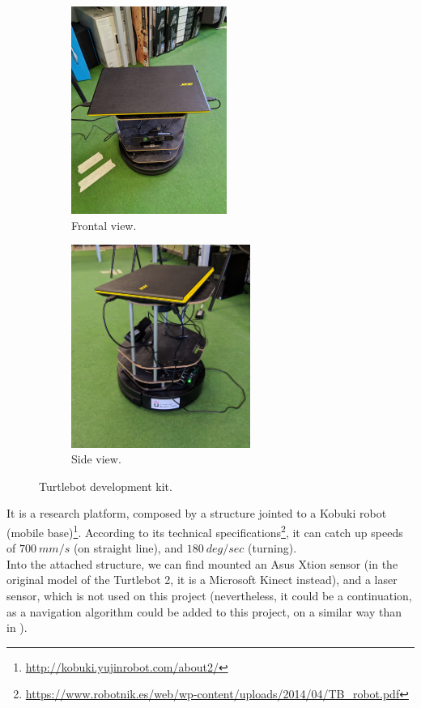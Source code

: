 		\begin{figure}[h]
			\centering
			\begin{subfigure}[h]{0.4\linewidth}
				\includegraphics[width=2in]{images/real_turtlebot_1}
				\caption{Frontal view.}
				\label{fig:3_turtlebot_front}
			\end{subfigure}
			\begin{subfigure}[h]{0.4\linewidth}
				\includegraphics[width=2.3in]{images/real_turtlebot_2}
				\caption{Side view.}
				\label{fig:3_turtlebot_side}
			\end{subfigure}
			\caption{Turtlebot development kit.}
			\label{fig:3_turtlebot}
		\end{figure}
		
		It is a research platform, composed by a structure jointed to a Kobuki robot (mobile base)\footnote{\url{http://kobuki.yujinrobot.com/about2/}}. According to its technical specifications\footnote{\url{https://www.robotnik.es/web/wp-content/uploads/2014/04/TB_robot.pdf}}, it can catch up speeds of $700 \ mm/s$ (on straight line), and $180\ deg/sec$ (turning).\\
		
		Into the attached structure, we can find mounted an Asus Xtion sensor (in the original model of the Turtlebot 2, it is a Microsoft Kinect instead), and a laser sensor, which is not used on this project (nevertheless, it could be a continuation, as a navigation algorithm could be added to this project, on a similar way than in \cite{rocapal}).\\
	
